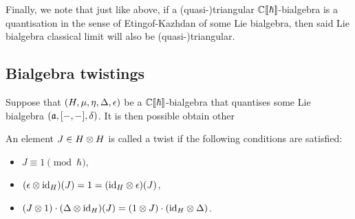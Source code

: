         Finally, we note that just like above, if a (quasi-)triangular $\mathbb{C}[\![\hbar]\!]$-bialgebra is a quantisation in the sense of Etingof-Kazhdan of some Lie bialgebra, then said Lie bialgebra classical limit will also be (quasi-)triangular.

    \subsection{Bialgebra twistings}
        Suppose that $(H, \mu, \eta, \Delta, \epsilon)$ be a $\mathbb{C}[\![\hbar]\!]$-bialgebra that quantises some Lie bialgebra $(\mathfrak{a}, [-, -], \delta)$. It is then possible obtain other 
        \begin{definition} \label{def: drinfeld_twists}
            An element $J \in H \tensor H$ is called a twist if the following conditions are satisfied:
            \begin{itemize}
                \item $J \equiv 1 \pmod{\hbar}$,
                \item $(\e \tensor \id_H)(J) = 1 = (\id_H \tensor \e)(J)$,
                \item $(J \tensor 1) \cdot (\Delta \tensor \id_H)(J) = (1 \tensor J) \cdot (\id_H \tensor \Delta)$.
            \end{itemize}
        \end{definition}